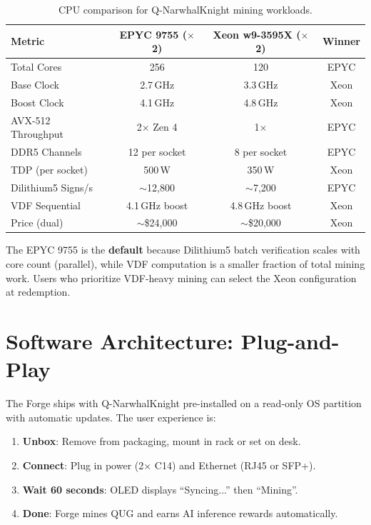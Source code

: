 \documentclass[11pt,a4paper]{article}
\begin{document}
\begin{table}[H]
\centering
\begin{tabular}{@{}lccc@{}}
\toprule
\textbf{Metric} & \textbf{EPYC 9755 ($\times$2)} & \textbf{Xeon w9-3595X ($\times$2)} & \textbf{Winner} \\
\midrule
Total Cores & 256 & 120 & EPYC \\
Base Clock & 2.7\,GHz & 3.3\,GHz & Xeon \\
Boost Clock & 4.1\,GHz & 4.8\,GHz & Xeon \\
AVX-512 Throughput & 2$\times$ Zen 4 & 1$\times$ & EPYC \\
DDR5 Channels & 12 per socket & 8 per socket & EPYC \\
TDP (per socket) & 500\,W & 350\,W & Xeon \\
Dilithium5 Signs/s & $\sim$12,800 & $\sim$7,200 & EPYC \\
VDF Sequential & 4.1\,GHz boost & 4.8\,GHz boost & Xeon \\
Price (dual) & $\sim$\$24,000 & $\sim$\$20,000 & Xeon \\
\bottomrule
\end{tabular}
\caption{CPU comparison for Q-NarwhalKnight mining workloads.}
\end{table}

The EPYC 9755 is the \textbf{default} because Dilithium5 batch verification scales with core count (parallel), while VDF computation is a smaller fraction of total mining work. Users who prioritize VDF-heavy mining can select the Xeon configuration at redemption.

\section{Software Architecture: Plug-and-Play}

The Forge ships with Q-NarwhalKnight pre-installed on a read-only OS partition with automatic updates. The user experience is:

\begin{enumerate}
    \item \textbf{Unbox}: Remove from packaging, mount in rack or set on desk.
    \item \textbf{Connect}: Plug in power (2$\times$ C14) and Ethernet (RJ45 or SFP+).
    \item \textbf{Wait 60 seconds}: OLED displays ``Syncing...'' then ``Mining''.
    \item \textbf{Done}: Forge mines QUG and earns AI inference rewards automatically.
\end{enumerate}
\end{document}

